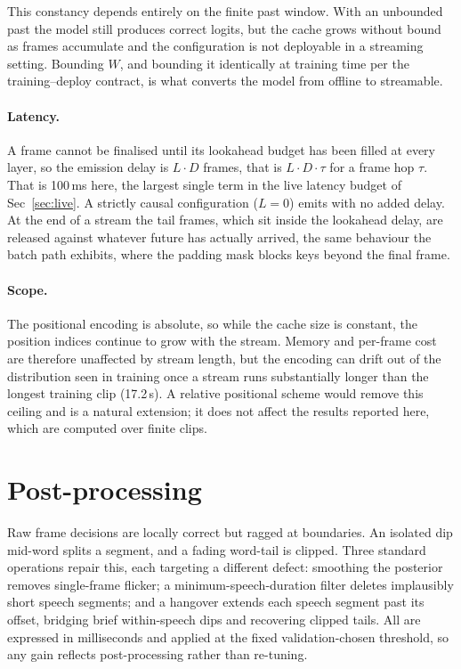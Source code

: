 \documentclass{article}
\begin{document}
This constancy depends entirely on the finite past window. With an unbounded past the model
still produces correct logits, but the cache grows without bound as frames accumulate and
the configuration is not deployable in a streaming setting. Bounding $W$, and bounding it identically at training time per the training--deploy contract, is what converts the
model from offline to streamable.

\paragraph{Latency.} A frame cannot be finalised until its lookahead budget has been filled
at every layer, so the emission delay is $L\!\cdot\!D$ frames, that is $L\!\cdot\!D\!\cdot\!\tau$
for a frame hop $\tau$. That is 100\,ms here, the largest single term in the live latency
budget of Sec~\ref{sec:live}. A strictly causal configuration ($L=0$) emits with no added
delay. At the end of a stream the tail frames, which sit inside the lookahead delay, are
released against whatever future has actually arrived, the same behaviour the batch path
exhibits, where the padding mask blocks keys beyond the final frame.

\paragraph{Scope.} The positional encoding is absolute, so while the cache size is constant,
the position indices continue to grow with the stream. Memory and per-frame cost are
therefore unaffected by stream length, but the encoding can drift out of the distribution
seen in training once a stream runs substantially longer than the longest training clip
(17.2\,s). A relative positional scheme would remove this ceiling and is a natural
extension; it does not affect the results reported here, which are computed over finite
clips.

\section{Post-processing}
\label{sec:post}

Raw frame decisions are locally correct but ragged at boundaries. An isolated dip mid-word splits a segment, and a fading word-tail is clipped. Three standard operations repair this, each targeting a different defect: smoothing the posterior removes single-frame flicker; a minimum-speech-duration filter deletes implausibly short speech segments; and a hangover extends each speech segment past its offset, bridging brief within-speech dips and recovering clipped tails. All are expressed in milliseconds and applied at the fixed validation-chosen threshold, so any gain reflects post-processing rather than re-tuning.
\end{document}
